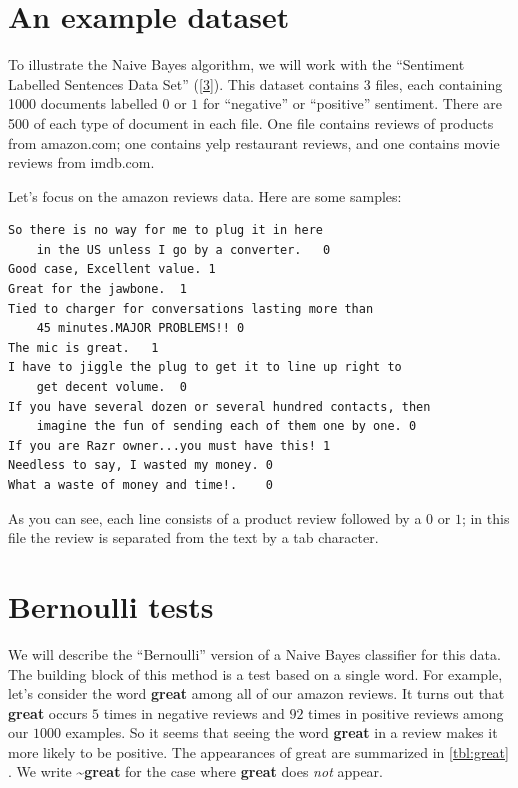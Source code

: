 \documentclass[
  oneside]{scrbook}
\begin{document}
\hypertarget{an-example-dataset}{%
\section{An example dataset}\label{an-example-dataset}}

To illustrate the Naive Bayes algorithm, we will work with the
``Sentiment Labelled Sentences Data Set''
({[}\protect\hyperlink{ref-sentences}{3}{]}). This dataset contains 3
files, each containing 1000 documents labelled \(0\) or \(1\) for
``negative'' or ``positive'' sentiment. There are 500 of each type of
document in each file. One file contains reviews of products from
amazon.com; one contains yelp restaurant reviews, and one contains movie
reviews from imdb.com.

Let's focus on the amazon reviews data. Here are some samples:

\begin{verbatim}
So there is no way for me to plug it in here 
    in the US unless I go by a converter.   0
Good case, Excellent value. 1
Great for the jawbone.  1
Tied to charger for conversations lasting more than 
    45 minutes.MAJOR PROBLEMS!! 0
The mic is great.   1
I have to jiggle the plug to get it to line up right to 
    get decent volume.  0
If you have several dozen or several hundred contacts, then 
    imagine the fun of sending each of them one by one. 0
If you are Razr owner...you must have this! 1
Needless to say, I wasted my money. 0
What a waste of money and time!.    0
\end{verbatim}

As you can see, each line consists of a product review followed by a
\(0\) or \(1\); in this file the review is separated from the text by a
tab character.

\hypertarget{bernoulli-tests}{%
\section{Bernoulli tests}\label{bernoulli-tests}}

We will describe the ``Bernoulli'' version of a Naive Bayes classifier
for this data. The building block of this method is a test based on a
single word. For example, let's consider the word \textbf{great} among
all of our amazon reviews. It turns out that \textbf{great} occurs \(5\)
times in negative reviews and \(92\) times in positive reviews among our
\(1000\) examples. So it seems that seeing the word \textbf{great} in a
review makes it more likely to be positive. The appearances of great are
summarized in \cref{tbl:great} . We write
\textasciitilde{}\textbf{great} for the case where \textbf{great} does
\emph{not} appear.
\end{document}
